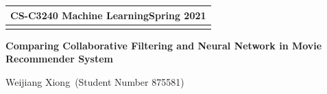 \documentclass[a4paper,11pt]{article} %
\newcommand{\lineSpace}{1.1}
\newcommand{\exeNum}{}
\newcommand{\assType}{Comparing Collaborative Filtering and Neural Network in Movie Recommender System}
\newcommand{\courseName}{CS-C3240 Machine Learning}
\newcommand{\semester}{Spring 2021}
\newcommand{\studentName}{Weijiang Xiong}
\newcommand{\studentNumber}{875581}
\begin{document}
\linespread{\lineSpace} %




\thispagestyle{empty} %

\begin{tabular}{p{15.5cm}} %
{\large \bf \courseName \hfill \semester} \\
\hline %
\\
\end{tabular} %


\begin{center} %
	{\Large \bf \assType\ \exeNum} %

	{\studentName\ (Student Number \studentNumber)} %
		
\end{center}  
% 


\end{document}
